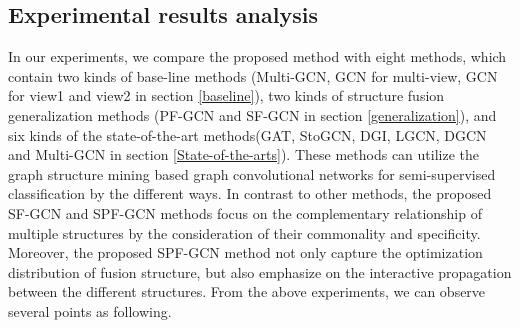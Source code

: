 \documentclass[review]{elsarticle}
\begin{document}
\subsection{Experimental results analysis}
\label{analysis}
In our experiments, we compare the proposed method with eight methods, which contain two kinds of base-line methods (Multi-GCN\cite{khan2019multi}, GCN \cite{kipf2016semi} for multi-view, GCN \cite{kipf2016semi} for view1 and view2 in section \ref{baseline}), two kinds of structure fusion generalization methods (PF-GCN and SF-GCN in section \ref{generalization}), and six kinds of the state-of-the-art methods(GAT\cite{Veli2017Graph}, StoGCN\cite{2017arXiv171010568C}, DGI\cite{Veli2018Deep}, LGCN\cite{2018arXiv180803965G}, DGCN\cite{zhuang2018dual} and Multi-GCN\cite{khan2019multi} in section \ref{State-of-the-arts}). These methods can utilize the graph structure mining based graph convolutional networks for semi-supervised classification by the different ways. In contrast to other methods, the proposed SF-GCN and SPF-GCN methods focus on the complementary relationship of multiple structures by the consideration of their commonality and specificity. Moreover, the proposed SPF-GCN method not only capture the optimization distribution of fusion structure, but also emphasize on the interactive propagation between the different structures. From the above experiments, we can observe several points as following.
\end{document}
